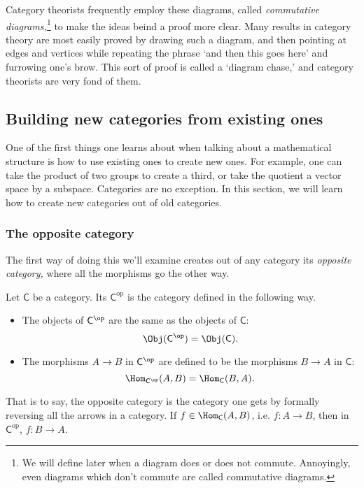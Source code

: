 \documentclass[notes.tex]{subfiles}
\begin{document}
Category theorists frequently employ these diagrams, called \emph{commutative diagrams,}\footnote{We will define later when a diagram does or does not commute. Annoyingly, even diagrams which don't commute are called commutative diagrams.} to make the ideas beind a proof more clear. Many results in category theory are most easily proved by drawing such a diagram, and then pointing at edges and vertices while repeating the phrase `and then this goes here' and furrowing one's brow. This sort of proof is called a `diagram chase,' and category theorists are very fond of them.


\subsection{Building new categories from existing ones}

One of the first things one learns about when talking about a mathematical structure is how to use existing ones to create new ones. For example, one can take the product of two groups to create a third, or take the quotient a vector space by a subspace. Categories are no exception. In this section, we will learn how to create new categories out of old categories.


\subsubsection{The opposite category}

The first way of doing this we'll examine creates out of any category its \emph{opposite category,} where all the morphisms go the other way.

\begin{definition}
  \label{def:oppositecategory}
  Let $\mathsf{C}$ be a category. Its  $\mathsf{C}^{\mathrm{op}}$ is the category defined in the following way.
  \begin{itemize}
    \item The objects of $\mathsf{C}^{\op}$ are the same as the objects of $\mathsf{C}$:
      \begin{equation*}
        \Obj(\mathsf{C}^{\op}) = \Obj(\mathsf{\mathsf{C}}).
      \end{equation*}

    \item The morphisms $A \to B$ in $\mathsf{C}^{\op}$ are defined to be the morphisms $B \to A$ in $\mathsf{C}$:
      \begin{equation*}
        \Hom_{\mathsf{C}^{\op}}(A, B) = \Hom_{\mathsf{C}}(B, A).
      \end{equation*}
  \end{itemize}

  That is to say, the opposite category is the category one gets by formally reversing all the arrows in a category. If $f \in \Hom_{\mathsf{C}}(A, B)$, i.e. $f \colon A \to B$, then in $\mathsf{C}^{\mathrm{op}}$, $f\colon B \to A$.
\end{definition}
\end{document}
